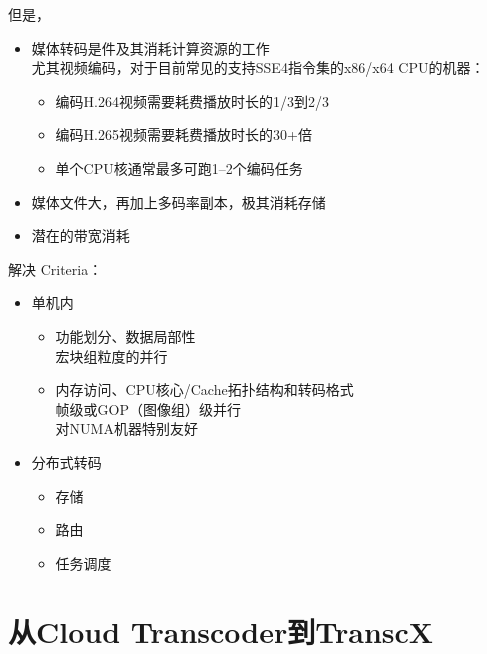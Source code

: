 \documentclass{beamer}
\begin{document}
\begin{frame}{但是，}
\pause
\begin{itemize}
\item 媒体转码是件及其消耗计算资源的工作\\ %
	尤其视频编码，对于目前常见的支持SSE4指令集的x86/x64 CPU的机器：
	\begin{itemize}
	\item  编码H.264视频需要耗费播放时长的1/3到2/3
	\item  编码H.265视频需要耗费播放时长的30+倍
	\item  单个CPU核通常最多可跑1--2个编码任务
	\end{itemize}
\item 媒体文件大，再加上多码率副本，极其消耗存储
\item 潜在的带宽消耗
\end{itemize}
\end{frame}

\begin{frame}{解决}
\pause
Criteria： \pause
\begin{itemize}
\item 单机内\\
	\begin{itemize}
	\item 功能划分、数据局部性\\
	宏块组粒度的并行
	\item 内存访问、CPU核心/Cache拓扑结构和转码格式\\
	帧级或GOP（图像组）级并行\\
	对NUMA机器特别友好
	\end{itemize}
\item 分布式转码
	\begin{itemize}
		\item 存储
		\item 路由
		\item 任务调度
	\end{itemize}
\end{itemize}
\end{frame}

\section{从Cloud Transcoder到TranscX}
\end{document}
